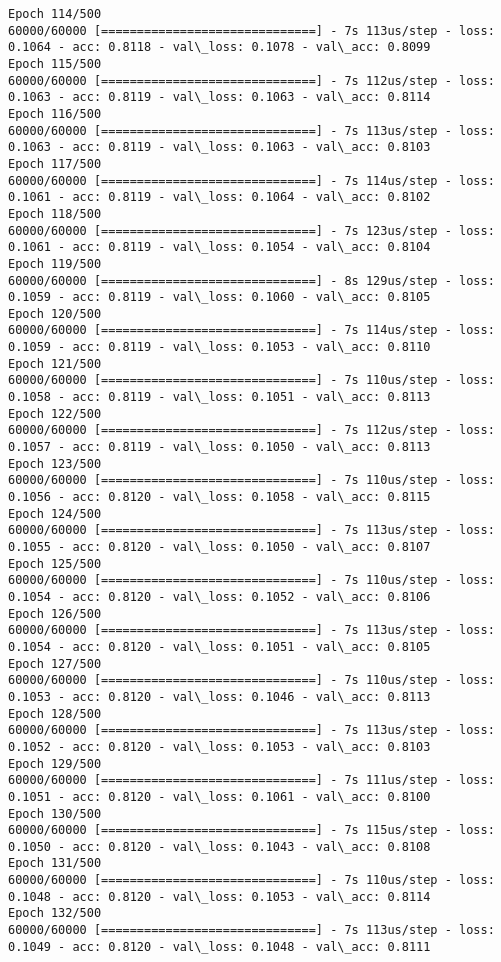 \documentclass[11pt]{article}
\begin{document}
\begin{Verbatim}[commandchars=\\\{\}]
Epoch 114/500
60000/60000 [==============================] - 7s 113us/step - loss: 0.1064 - acc: 0.8118 - val\_loss: 0.1078 - val\_acc: 0.8099
Epoch 115/500
60000/60000 [==============================] - 7s 112us/step - loss: 0.1063 - acc: 0.8119 - val\_loss: 0.1063 - val\_acc: 0.8114
Epoch 116/500
60000/60000 [==============================] - 7s 113us/step - loss: 0.1063 - acc: 0.8119 - val\_loss: 0.1063 - val\_acc: 0.8103
Epoch 117/500
60000/60000 [==============================] - 7s 114us/step - loss: 0.1061 - acc: 0.8119 - val\_loss: 0.1064 - val\_acc: 0.8102
Epoch 118/500
60000/60000 [==============================] - 7s 123us/step - loss: 0.1061 - acc: 0.8119 - val\_loss: 0.1054 - val\_acc: 0.8104
Epoch 119/500
60000/60000 [==============================] - 8s 129us/step - loss: 0.1059 - acc: 0.8119 - val\_loss: 0.1060 - val\_acc: 0.8105
Epoch 120/500
60000/60000 [==============================] - 7s 114us/step - loss: 0.1059 - acc: 0.8119 - val\_loss: 0.1053 - val\_acc: 0.8110
Epoch 121/500
60000/60000 [==============================] - 7s 110us/step - loss: 0.1058 - acc: 0.8119 - val\_loss: 0.1051 - val\_acc: 0.8113
Epoch 122/500
60000/60000 [==============================] - 7s 112us/step - loss: 0.1057 - acc: 0.8119 - val\_loss: 0.1050 - val\_acc: 0.8113
Epoch 123/500
60000/60000 [==============================] - 7s 110us/step - loss: 0.1056 - acc: 0.8120 - val\_loss: 0.1058 - val\_acc: 0.8115
Epoch 124/500
60000/60000 [==============================] - 7s 113us/step - loss: 0.1055 - acc: 0.8120 - val\_loss: 0.1050 - val\_acc: 0.8107
Epoch 125/500
60000/60000 [==============================] - 7s 110us/step - loss: 0.1054 - acc: 0.8120 - val\_loss: 0.1052 - val\_acc: 0.8106
Epoch 126/500
60000/60000 [==============================] - 7s 113us/step - loss: 0.1054 - acc: 0.8120 - val\_loss: 0.1051 - val\_acc: 0.8105
Epoch 127/500
60000/60000 [==============================] - 7s 110us/step - loss: 0.1053 - acc: 0.8120 - val\_loss: 0.1046 - val\_acc: 0.8113
Epoch 128/500
60000/60000 [==============================] - 7s 113us/step - loss: 0.1052 - acc: 0.8120 - val\_loss: 0.1053 - val\_acc: 0.8103
Epoch 129/500
60000/60000 [==============================] - 7s 111us/step - loss: 0.1051 - acc: 0.8120 - val\_loss: 0.1061 - val\_acc: 0.8100
Epoch 130/500
60000/60000 [==============================] - 7s 115us/step - loss: 0.1050 - acc: 0.8120 - val\_loss: 0.1043 - val\_acc: 0.8108
Epoch 131/500
60000/60000 [==============================] - 7s 110us/step - loss: 0.1048 - acc: 0.8120 - val\_loss: 0.1053 - val\_acc: 0.8114
Epoch 132/500
60000/60000 [==============================] - 7s 113us/step - loss: 0.1049 - acc: 0.8120 - val\_loss: 0.1048 - val\_acc: 0.8111

\end{Verbatim}
\end{document}
